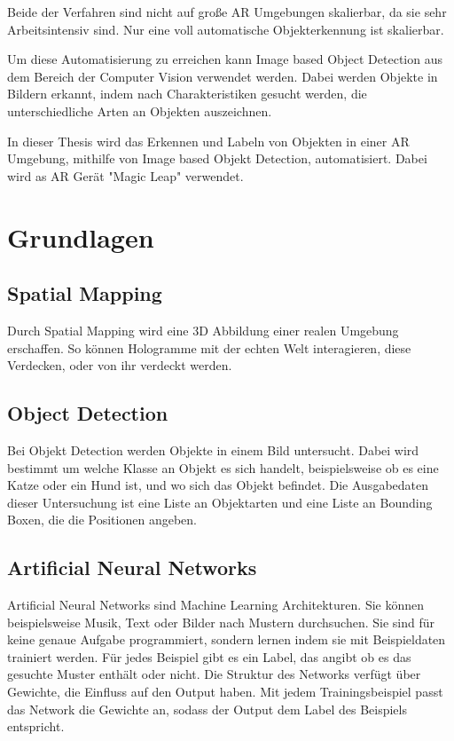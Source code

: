 \documentclass[german,a4paper, 12pt]{llncs}
\begin{document}
Beide der Verfahren sind nicht auf große AR Umgebungen skalierbar, da sie sehr Arbeitsintensiv sind. Nur eine voll automatische Objekterkennung ist skalierbar. 

Um diese Automatisierung zu erreichen kann Image based Object Detection aus dem Bereich der Computer Vision verwendet werden.
Dabei werden Objekte in Bildern erkannt, indem nach Charakteristiken gesucht werden, die unterschiedliche Arten an Objekten auszeichnen.\cite{introToCNN}

In dieser Thesis wird das Erkennen und Labeln von Objekten in einer AR Umgebung, mithilfe von Image based Objekt Detection, automatisiert. 
Dabei wird as AR Gerät "Magic Leap" verwendet. 


\section{Grundlagen}
\subsection*{Spatial Mapping} 
Durch Spatial Mapping wird eine 3D Abbildung einer realen Umgebung erschaffen. So können Hologramme mit der echten Welt interagieren, diese Verdecken, oder von ihr verdeckt werden.\cite{spatialMapping} 

\subsection*{Object Detection}
Bei Objekt Detection werden Objekte in einem Bild untersucht. Dabei wird bestimmt um welche Klasse an Objekt es sich handelt, beispielsweise ob es eine Katze oder ein Hund ist, und wo sich das Objekt befindet. Die Ausgabedaten dieser Untersuchung ist eine Liste an Objektarten und eine Liste an Bounding Boxen, die die Positionen angeben.

\subsection*{Artificial Neural Networks}
Artificial Neural Networks sind Machine Learning Architekturen. Sie können beispielsweise Musik, Text oder Bilder nach Mustern durchsuchen. Sie sind für keine genaue Aufgabe programmiert, sondern lernen indem sie mit Beispieldaten trainiert werden. Für jedes Beispiel gibt es ein Label, das angibt ob es das gesuchte Muster enthält oder nicht. Die Struktur des Networks verfügt über Gewichte, die Einfluss auf den Output haben. Mit jedem Trainingsbeispiel passt das Network die Gewichte an, sodass der Output dem Label des Beispiels entspricht.\cite{introToCNN,surveyOfDeepLearing}
\end{document}
